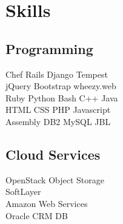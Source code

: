 \documentclass[letterpaper]{resume} %
\begin{document}
\begin{minipage}[t]{0.33\textwidth}
\section{Skills}

\subsection{Programming}

Chef \textbullet{} Rails \textbullet{} Django \textbullet{} Tempest\\
jQuery \textbullet{} Bootstrap \textbullet{} wheezy.web\\ 
Ruby \textbullet{} Python \textbullet{} Bash \textbullet{} C++ \textbullet{} Java\\
HTML \textbullet{} CSS \textbullet{} PHP \textbullet{} Javascript \\
Assembly \textbullet{} DB2 \textbullet{} MySQL \textbullet{} JBL

\sectionspace %

\subsection{Cloud Services}
OpenStack Object Storage \\
SoftLayer \\
Amazon Web Services \\
Oracle CRM DB \\


\end{minipage} %
\hfill
%
%
\end{document}
